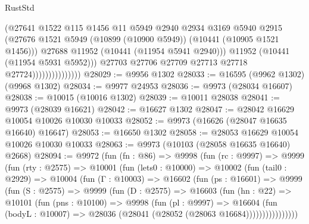 \begin{lexlean}{RustStd}
\begin{coremodule}
                                    (@27641
                                      @1522
                                      @115
                                      @1456
                                      @11
                                      @5949
                                      @2940
                                      @2934
                                      @3169
                                      @5940
                                      @2915
                                      (@27676
                                        @1521
                                        @5949
                                        (@10899 (@10900 @5949))
                                        (@10441 (@10905 @1521 @1456)))
                                      @27688
                                      @11952
                                      (@10441 (@11954 @5941 @2940)))
                                    @11952
                                    (@10441 (@11954 @5931 @5952)))
                                  @27703
                                  @27706
                                  @27709
                                  @27713
                                  @27718
                                  @27724)))))))))))))))
@28029 := @9956 @1302
@28033 := @16595 (@9962 @1302) (@9968 @1302)
@28034 := @9977 @24953
@28036 := @9973 (@28034 @16607)
@28038 := @10015 (@10016 @1302)
@28039 := @10011 @28038
@28041 := @9973 (@28039 @16621)
@28042 := @16627 @1302
@28047 := @28042 @16629 @10054 @10026 @10030 @10033
@28052 := @9973 (@16626 (@28047 @16635 @16640) @16647)
@28053 := @16650 @1302
@28058 := @28053 @16629 @10054 @10026 @10030 @10033
@28063 := @9973 (@10103 (@28058 @16635 @16640) @2668)
@28094 := @9972
    (fun (fn : @86) =>
    @9998
      (fun (rc : @9997) =>
      @9999
        (fun (rty : @2575) =>
        @10001
          (fun (lets0 : @10000) =>
          @10002
            (fun (tail0 : @2929) =>
            @10004
              (fun (Γ : @10003) =>
              @16602
                (fun (ps : @16601) =>
                @9999
                  (fun (S : @2575) =>
                  @9999
                    (fun (D : @2575) =>
                    @16603
                      (fun (hn : @22) =>
                      @10101
                        (fun (pns : @10100) =>
                        @9998
                          (fun (pl : @9997) =>
                          @16604
                            (fun (bodyL : @10007) =>
                            @28036 (@28041 (@28052 (@28063 @16684))))))))))))))))

\end{coremodule}
\end{lexlean}
